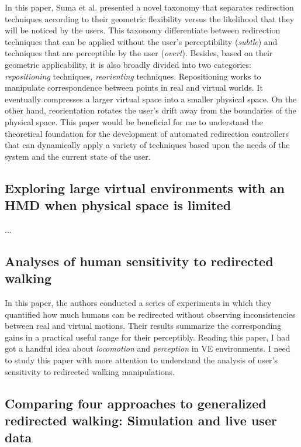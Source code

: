 \documentclass[12pt]{article}
\begin{document}
In this paper, Suma et al. presented a novel taxonomy that separates redirection techniques according to their geometric flexibility versus the likelihood that they will be noticed by the users. This taxonomy differentiate between redirection techniques that can be applied without the user's perceptibility (\emph{subtle}) and techniques that are perceptible by the user (\emph{overt}). Besides, based on their geometric applicability, it is also broadly divided into two categories: \emph{repositioning} techniques, \emph{reorienting} techniques. Repositioning works to manipulate correspondence between points in real and virtual worlds. It eventually compresses a larger virtual space into a smaller physical space. On the other hand, reorientation rotates the user's drift away from the boundaries of the physical space. This paper would be beneficial for me to understand the theoretical foundation for the development of automated redirection controllers that can dynamically apply a variety of techniques based upon the needs of the system and the current state of the user.

\subsection{Exploring large virtual environments with an HMD when physical space is limited}
\textbf{\cite{williams2007exploring}}

...

\subsection{Analyses of human sensitivity to redirected walking}
\textbf{\cite{steinicke2008analyses}}

In this paper, the authors conducted a series of experiments in which they quantified how much humans can be redirected without observing inconsistencies between real and virtual motions. Their results summarize the corresponding gains in a practical useful range for their perceptibly. Reading this paper, I had got a handful idea about \emph{locomotion} and \emph{perception} in VE environments. I need to study this paper with more attention to understand the analysis of user's sensitivity to redirected walking manipulations.

\subsection{Comparing four approaches to generalized redirected walking: Simulation and live user data}
\textbf{\cite{hodgson2013comparing}}
\end{document}
